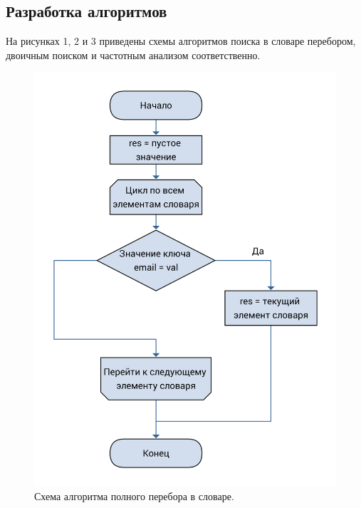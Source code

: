 \documentclass[a4paper, 12pt]{article}
\begin{document}
	\subsection{Разработка алгоритмов}
	\hspace*{5mm} На рисунках 1, 2 и 3 приведены схемы алгоритмов поиска в словаре перебором, двоичным поиском и частотным анализом соответственно. 
	\begin{figure}[h]
		\centering \includegraphics[scale=0.085]{full}
		\centering\caption{Схема алгоритма полного перебора в словаре.}
	\end{figure}
	\clearpage
	\newpage
\end{document}

